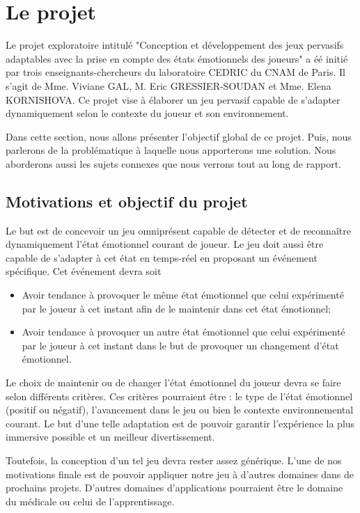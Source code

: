 \documentclass{article}
\begin{document}
\section{Le projet}
	Le projet exploratoire intitulé "Conception et développement des jeux pervasifs adaptables avec la prise en compte des états émotionnels des joueurs" a éé initié par trois enseignants-chercheurs du laboratoire CEDRIC du CNAM de Paris.
	Il s'agit de Mme. Viviane GAL, M. Eric GRESSIER-SOUDAN et Mme. Elena KORNISHOVA.
	Ce projet vise à élaborer un jeu pervasif capable de s'adapter dynamiquement selon le contexte du joueur et son environnement.\par
	Dans cette section, nous allons présenter l'objectif global de ce projet.
	Puis, nous parlerons de la problématique à laquelle nous apporterons une solution.
	Nous aborderons aussi les sujets connexes que nous verrons tout au long de rapport.
	\subsection{Motivations et objectif du projet}
		Le but est de concevoir un jeu omniprésent capable de détecter et de reconnaître dynamiquement l'état émotionnel courant de joueur. 
		Le jeu doit aussi être capable de s'adapter à cet état en temps-réel en proposant un événement spécifique. 
		Cet événement devra soit 
		\begin{itemize}
			\item Avoir tendance à provoquer le même état émotionnel que celui expérimenté par le joueur à cet instant afin de le maintenir dans cet état émotionnel;
			\item Avoir tendance à provoquer un autre état émotionnel que celui expérimenté par le joueur à cet instant dans le but de provoquer un changement d'état émotionnel.
		\end{itemize}
		Le choix de maintenir ou de changer l'état émotionnel du joueur devra se faire selon différents critères.
		Ces critères pourraient être : le type de l'état émotionnel (positif ou négatif), l'avancement dans le jeu ou bien le contexte environnemental courant.
		Le but d'une telle adaptation est de pouvoir garantir l'expérience la plus immersive possible et un meilleur divertissement.\par
		Toutefois, la conception d'un tel jeu devra rester assez générique.
		L'une de nos motivations finale est de pouvoir appliquer notre jeu à d'autres domaines dans de prochains projets.
		D'autres domaines d'applications pourraient être le domaine du médicale ou celui de l'apprentissage.
\end{document}
